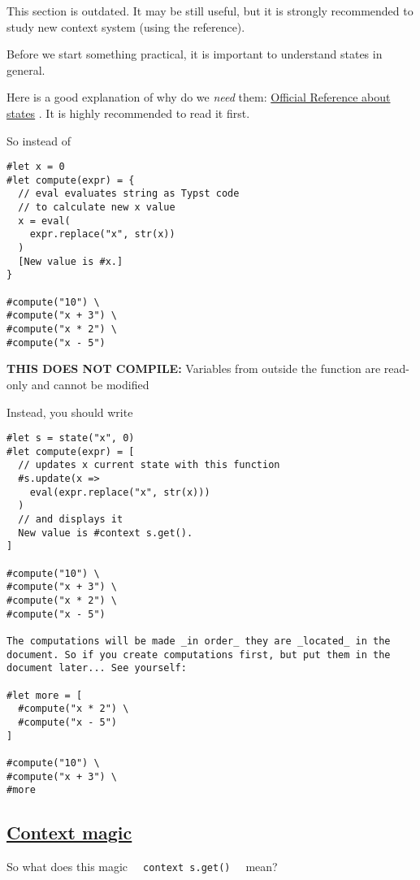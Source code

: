 This section is outdated. It may be still useful, but it is strongly
recommended to study new context system (using the reference).

Before we start something practical, it is important to understand
states in general.

Here is a good explanation of why do we \emph{need} them:
\href{https://typst.app/docs/reference/meta/state/}{Official Reference
about states} . It is highly recommended to read it first.

So instead of

\begin{verbatim}
#let x = 0
#let compute(expr) = {
  // eval evaluates string as Typst code
  // to calculate new x value
  x = eval(
    expr.replace("x", str(x))
  )
  [New value is #x.]
}

#compute("10") \
#compute("x + 3") \
#compute("x * 2") \
#compute("x - 5")
\end{verbatim}

\textbf{THIS DOES NOT COMPILE:} Variables from outside the function are
read-only and cannot be modified

Instead, you should write

\begin{verbatim}
#let s = state("x", 0)
#let compute(expr) = [
  // updates x current state with this function
  #s.update(x =>
    eval(expr.replace("x", str(x)))
  )
  // and displays it
  New value is #context s.get().
]

#compute("10") \
#compute("x + 3") \
#compute("x * 2") \
#compute("x - 5")

The computations will be made _in order_ they are _located_ in the document. So if you create computations first, but put them in the document later... See yourself:

#let more = [
  #compute("x * 2") \
  #compute("x - 5")
]

#compute("10") \
#compute("x + 3") \
#more
\end{verbatim}

\pandocbounded{}

\subsection{\texorpdfstring{\hyperref[context-magic]{Context
magic}}{Context magic}}\label{context-magic}

So what does this magic
\texttt{\ }{\texttt{\ context\ s.get()\ }}\texttt{\ } mean?

